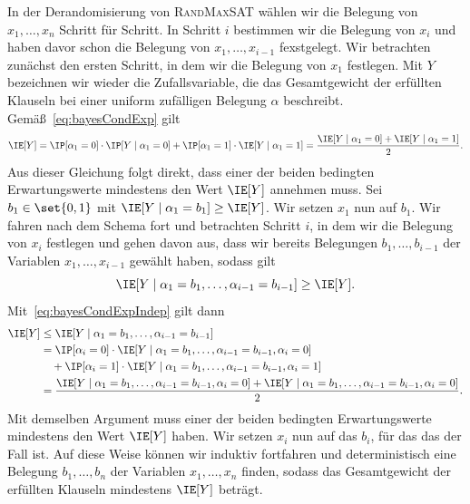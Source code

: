 \documentclass[language=ngerman,algolist]{TemplateLecture}
\begin{document}
In der Derandomisierung von \textsc{RandMaxSAT} wählen wir die Belegung von $x_1, \ldots, x_n$ Schritt für Schritt. In Schritt $i$ bestimmen wir die Belegung von $x_i$ und haben davor schon die Belegung von $x_1, \ldots, x_{i-1}$ fexstgelegt. Wir betrachten zunächst den ersten Schritt, in dem wir die Belegung von $x_1$ festlegen. Mit $Y$ bezeichnen wir wieder die Zufallsvariable, die das Gesamtgewicht der erfüllten Klauseln bei einer uniform zufälligen Belegung $\alpha$ beschreibt. Gemäß~\eqref{eq:bayesCondExp} gilt 
\begin{equation*}
    \IE[Y] = \IP[\alpha_1 = 0] \cdot \IP[Y \mid \alpha_1 = 0] + \IP[\alpha_1 = 1] \cdot \IE[Y \mid \alpha_1 = 1] = \frac{\IE[Y \mid \alpha_1 = 0] + \IE[Y \mid \alpha_1 = 1]}{2}.
\end{equation*}
Aus dieser Gleichung folgt direkt, dass einer der beiden bedingten Erwartungswerte mindestens den Wert $\IE[Y]$ annehmen muss. Sei $b_1 \in \set{0,1}$ mit $\IE[Y \mid \alpha_1 = b_1] \geq \IE[Y]$. Wir setzen $x_1$ nun auf $b_1$. Wir fahren nach dem Schema fort und betrachten Schritt $i$, in dem wir die Belegung von $x_i$ festlegen und gehen davon aus, dass wir bereits Belegungen $b_1, \ldots, b_{i-1}$ der Variablen $x_1, \ldots, x_{i-1}$ gewählt haben, sodass gilt 
\begin{equation*}
    \IE[Y \mid \alpha_1 = b_1, \ldots, \alpha_{i-1} = b_{i-1}] \geq \IE[Y].
\end{equation*}
Mit~\eqref{eq:bayesCondExpIndep} gilt dann 
\begin{equation*}
    \begin{split}
        \IE[Y] &\leq \IE[Y \mid \alpha_1 = b_1, \ldots, \alpha_{i-1} = b_{i-1}] \\
               &= \IP[\alpha_i = 0] \cdot \IE[Y \mid \alpha_1 = b_1, \ldots, \alpha_{i-1} = b_{i-1}, \alpha_i = 0] \\ &\quad+ \IP[\alpha_i = 1] \cdot \IE[Y \mid \alpha_1 = b_1, \ldots, \alpha_{i-1} = b_{i-1}, \alpha_i = 1] \\
               &= \frac{\IE[Y \mid \alpha_1 = b_1, \ldots, \alpha_{i-1} = b_{i-1}, \alpha_i = 0] + \IE[Y \mid \alpha_1 = b_1, \ldots, \alpha_{i-1} = b_{i-1}, \alpha_i = 0]}{2}.
    \end{split}
\end{equation*}
Mit demselben Argument muss einer der beiden bedingten Erwartungswerte mindestens den Wert $\IE[Y]$ haben. Wir setzen $x_i$ nun auf das $b_i$, für das das der Fall ist. Auf diese Weise können wir induktiv fortfahren und deterministisch eine Belegung $b_1, \ldots, b_n$ der Variablen $x_1, \ldots, x_n$ finden, sodass das Gesamtgewicht der erfüllten Klauseln mindestens $\IE[Y]$ beträgt.
\end{document}
